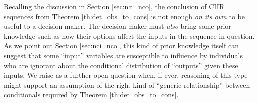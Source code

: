 Recalling the discussion in Section \ref{sec:nci_nco}, the conclusion of CIIR sequences from Theorem \ref{th:det_obs_to_cons} is not enough \emph{on its own} to be useful to a decision maker. The decision maker must \emph{also} bring some prior knowledge such as how their options affect the inputs in the sequence in question. As we point out Section \ref{sec:nci_nco}, this kind of prior knowledge itself can suggest that some ``input'' variables are susceptible to influence by individuals who are ignorant about the conditional distribution of ``outputs'' given these inputs. We raise as a further open question when, if ever, reasoning of this type might support an assumption of the right kind of ``generic relationship'' between conditionals required by Theorem \ref{th:det_obs_to_cons}.


